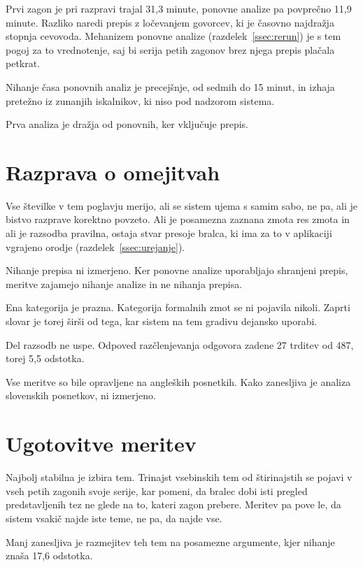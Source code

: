 \documentclass[a4paper, 12pt]{book}
\begin{document}
Prvi zagon je pri razpravi trajal 31,3 minute, ponovne analize pa povprečno 11,9
minute. Razliko naredi prepis z ločevanjem govorcev, ki je časovno najdražja
stopnja cevovoda. Mehanizem ponovne analize (razdelek~\ref{ssec:rerun}) je s tem
pogoj za to vrednotenje, saj bi serija petih zagonov brez njega prepis plačala
petkrat.

Nihanje časa ponovnih analiz je precejšnje, od sedmih do 15 minut, in izhaja
pretežno iz zunanjih iskalnikov, ki niso pod nadzorom sistema.

Prva analiza je dražja od ponovnih, ker vključuje prepis.

\section{Razprava o omejitvah}
\label{sec:razprava}

Vse številke v tem poglavju merijo, ali se sistem ujema s samim sabo, ne pa,
ali je bistvo razprave korektno povzeto. Ali je posamezna zaznana zmota res zmota in ali je razsodba pravilna, ostaja stvar presoje bralca, ki ima za to v aplikaciji vgrajeno
orodje (razdelek~\ref{ssec:urejanje}).

Nihanje prepisa ni izmerjeno. Ker ponovne analize uporabljajo shranjeni prepis,
meritve zajamejo nihanje analize in ne nihanja prepisa.

Ena kategorija je prazna. Kategorija formalnih zmot se ni pojavila nikoli.
Zaprti slovar je torej širši od tega, kar sistem na tem gradivu dejansko
uporabi.

Del razsodb ne uspe. Odpoved razčlenjevanja odgovora zadene 27 trditev od 487,
torej 5,5 odstotka.

Vse meritve so bile opravljene na angleških posnetkih. Kako zanesljiva je
analiza slovenskih posnetkov, ni izmerjeno.

\section{Ugotovitve meritev}
\label{sec:sklepi-meritev}

Najbolj stabilna je izbira tem. Trinajst vsebinskih tem
od štirinajstih se pojavi v vseh petih zagonih svoje serije, kar pomeni, da
bralec dobi isti pregled predstavljenih tez ne glede na to, kateri zagon
prebere. Meritev pa pove le, da sistem vsakič najde iste teme, ne pa, da najde vse.

Manj zanesljiva je razmejitev teh tem na posamezne argumente, kjer nihanje znaša
17,6 odstotka. 
\end{document}

